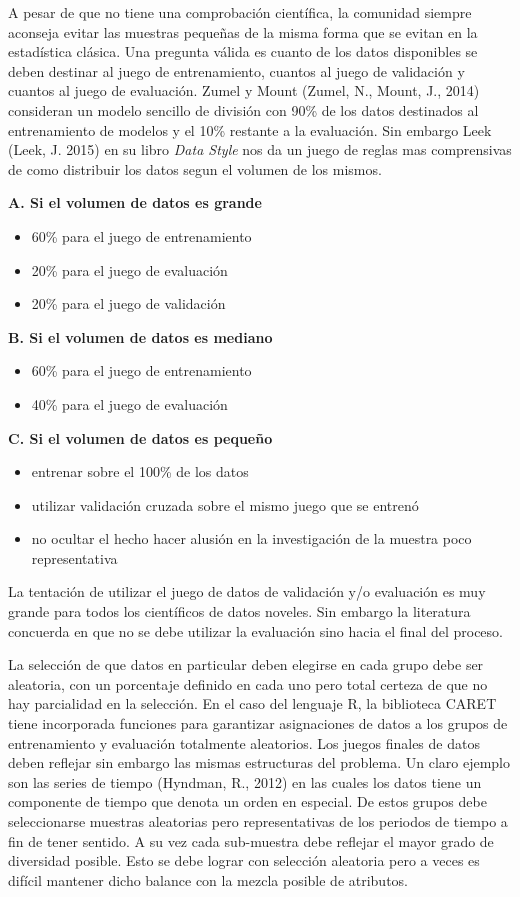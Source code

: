 A pesar de que no tiene una comprobación científica, la comunidad siempre aconseja evitar las muestras pequeñas de la misma forma que se evitan en la estadística clásica. Una pregunta válida es cuanto de los datos disponibles se deben destinar al juego de entrenamiento, cuantos al juego de validación y cuantos al juego de evaluación. Zumel y Mount (Zumel, N., Mount, J., 2014) consideran un modelo sencillo de división con 90\% de los datos destinados al entrenamiento de modelos y el 10\% restante a la evaluación. Sin embargo Leek (Leek, J. 2015) en su libro \emph{Data Style} nos da un juego de reglas mas comprensivas de como distribuir los datos segun el volumen de los mismos.

\textbf{A. Si el volumen de datos es grande}
\begin{itemize}
	\item 60\% para el juego de entrenamiento
	\item 20\% para el juego de evaluación
	\item 20\% para el juego de validación
\end{itemize}

\textbf{B. Si el volumen de datos es mediano}
\begin{itemize}
	\item 60\% para el juego de entrenamiento
	\item 40\% para el juego de evaluación
\end{itemize}

\textbf{C. Si el volumen de datos es pequeño}
\begin{itemize}
	\item entrenar sobre el 100\% de los datos
	\item utilizar validación cruzada sobre el mismo juego que se entrenó
	\item no ocultar el hecho hacer alusión en la investigación de la muestra poco representativa
\end{itemize}

La tentación de utilizar el juego de datos de validación y/o evaluación es muy grande para todos los científicos de datos noveles. Sin embargo la literatura concuerda en que no se debe utilizar la evaluación sino hacia el final del proceso.

La selección de que datos en particular deben elegirse en cada grupo debe ser aleatoria, con un porcentaje definido en cada uno pero total certeza de que no hay parcialidad en la selección. En el caso del lenguaje R, la biblioteca CARET tiene incorporada funciones para garantizar asignaciones de datos a los grupos de entrenamiento y evaluación totalmente aleatorios. Los juegos finales de datos deben reflejar sin embargo las mismas estructuras del problema. Un claro ejemplo son las series de tiempo (Hyndman, R., 2012) en las cuales los datos tiene un componente de tiempo que denota un orden en especial. De estos grupos debe seleccionarse muestras aleatorias pero representativas de los periodos de tiempo a fin de tener sentido. A su vez cada sub-muestra debe reflejar el mayor grado de diversidad posible. Esto se debe lograr con selección aleatoria pero a veces es difícil mantener dicho balance con la mezcla posible de atributos.

